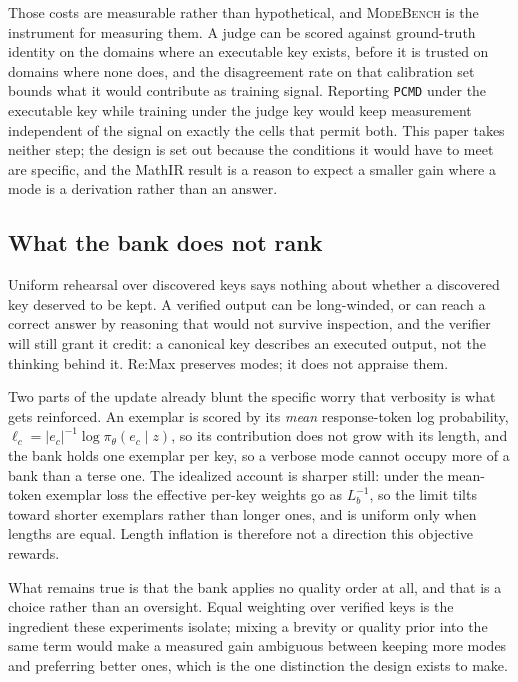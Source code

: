 \documentclass{article}
\newcommand{\1}{\mathbf 1}
\newcommand{\mb}{\textsc{ModeBench}}
\newcommand{\pmd}{\texttt{PCMD}}
\theoremstyle{remark}
\theoremstyle{definition}
\theoremstyle{plain}
\begin{document}
Those costs are measurable rather than hypothetical, and \mb{} is the
instrument for measuring them. A judge can be scored against ground-truth
identity on the domains where an executable key exists, before it is trusted
on domains where none does, and the disagreement rate on that calibration set
bounds what it would contribute as training signal. Reporting \pmd{} under the
executable key while training under the judge key would keep measurement
independent of the signal on exactly the cells that permit both. This paper
takes neither step; the design is set out because the conditions it would have
to meet are specific, and the MathIR result is a reason to expect a smaller
gain where a mode is a derivation rather than an answer.

\subsection{What the bank does not rank}
\label{app:algorithm-quality}

Uniform rehearsal over discovered keys says nothing about whether a discovered
key deserved to be kept. A verified output can be long-winded, or can reach a
correct answer by reasoning that would not survive inspection, and the
verifier will still grant it credit: a canonical key describes an executed
output, not the thinking behind it. Re:Max preserves modes; it does not
appraise them.

Two parts of the update already blunt the specific worry that verbosity is
what gets reinforced. An exemplar is scored by its \emph{mean} response-token
log probability, $\ell_c=|e_c|^{-1}\log\pi_\theta(e_c\mid z)$, so its
contribution does not grow with its length, and the bank holds one exemplar
per key, so a verbose mode cannot occupy more of a bank than a terse one. The
idealized account is sharper still: under the mean-token exemplar loss the
effective per-key weights go as $L_b^{-1}$, so the limit tilts toward shorter
exemplars rather than longer ones, and is uniform only when lengths are equal.
Length inflation is therefore not a direction this objective rewards.

What remains true is that the bank applies no quality order at all, and that
is a choice rather than an oversight. Equal weighting over verified keys is
the ingredient these experiments isolate; mixing a brevity or quality prior
into the same term would make a measured gain ambiguous between keeping more
modes and preferring better ones, which is the one distinction the design
exists to make.
\end{document}
